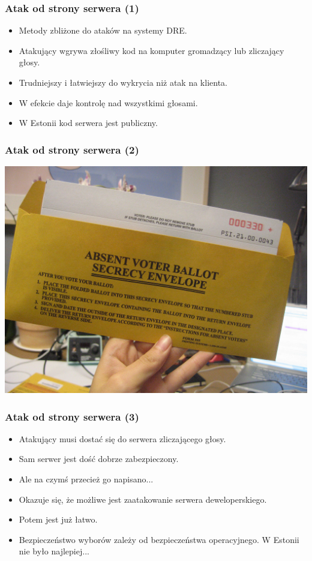 \documentclass{beamer}
\begin{document}
\begin{frame}
\frametitle{Atak od strony serwera (1)}
\begin{itemize}
\item Metody zbliżone do ataków na systemy DRE. \pause
\item Atakujący wgrywa złośliwy kod na komputer gromadzący lub zliczający głosy. \pause
\item Trudniejszy i łatwiejszy do wykrycia niż atak na klienta. \pause
\item W efekcie daje kontrolę nad wszystkimi głosami. \pause
\item W Estonii kod serwera jest publiczny.
\end{itemize}
\end{frame}

\begin{frame}
\frametitle{Atak od strony serwera (2)}
\includegraphics[height=0.8\paperheight, center]{envelope}
\end{frame}

\begin{frame}
\frametitle{Atak od strony serwera (3)}
\begin{itemize}
\item Atakujący musi dostać się do serwera zliczającego głosy. \pause
\item Sam serwer jest dość dobrze zabezpieczony. \pause
\item Ale na czymś przecież go napisano... \pause
\item Okazuje się, że możliwe jest zaatakowanie serwera deweloperskiego. \pause
\item Potem jest już łatwo. \pause
\item Bezpieczeństwo wyborów zależy od bezpieczeństwa operacyjnego. W Estonii nie było najlepiej...
\end{itemize}
\end{frame}
\end{document}
